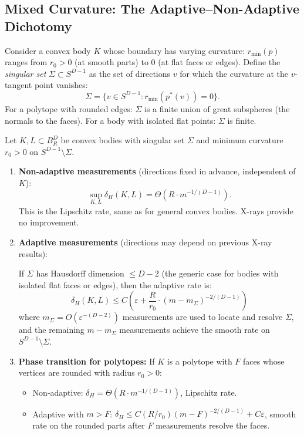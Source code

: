 
\subsection{Mixed Curvature: The Adaptive--Non-Adaptive Dichotomy}

Consider a convex body $K$ whose boundary has varying curvature: $r_{\min}(p)$ ranges from $r_0 > 0$ (at smooth parts) to $0$ (at flat faces or edges). Define the \emph{singular set} $\Sigma \subset S^{D-1}$ as the set of directions $v$ for which the curvature at the $v$-tangent point vanishes:
\[
  \Sigma = \{v \in S^{D-1} : r_{\min}(p^*(v)) = 0\}.
\]
For a polytope with rounded edges: $\Sigma$ is a finite union of great subspheres (the normals to the faces). For a body with isolated flat points: $\Sigma$ is finite.

\begin{theorem}
\label{thm:mixed}
Let $K, L \subset B_R^D$ be convex bodies with singular set $\Sigma$ and minimum curvature $r_0 > 0$ on $S^{D-1} \setminus \Sigma$.

\begin{enumerate}[label=(\alph*)]
  \item \textbf{Non-adaptive measurements} (directions fixed in advance, independent of $K$):
  \[
    \sup_{K, L} \delta_H(K, L) = \Theta\!\left(R \cdot m^{-1/(D-1)}\right).
  \]
  This is the Lipschitz rate, same as for general convex bodies. X-rays provide no improvement.

  \item \textbf{Adaptive measurements} (directions may depend on previous X-ray results):

  If $\Sigma$ has Hausdorff dimension $\leq D - 2$ (the generic case for bodies with isolated flat faces or edges), then the adaptive rate is:
  \[
    \delta_H(K, L) \leq C\!\left(\varepsilon + \frac{R}{r_0} \cdot (m - m_\Sigma)^{-2/(D-1)}\right)
  \]
  where $m_\Sigma = O\!\left(\varepsilon^{-(D-2)}\right)$ measurements are used to locate and resolve $\Sigma$, and the remaining $m - m_\Sigma$ measurements achieve the smooth rate on $S^{D-1} \setminus \Sigma$.

  \item \textbf{Phase transition for polytopes:} If $K$ is a polytope with $F$ faces whose vertices are rounded with radius $r_0 > 0$:
  \begin{itemize}
    \item Non-adaptive: $\delta_H = \Theta(R \cdot m^{-1/(D-1)})$, Lipschitz rate.
    \item Adaptive with $m > F$: $\delta_H \leq C(R/r_0)(m - F)^{-2/(D-1)} + C\varepsilon$, smooth rate on the rounded parts after $F$ measurements resolve the faces.
  \end{itemize}
\end{enumerate}
\end{theorem}

